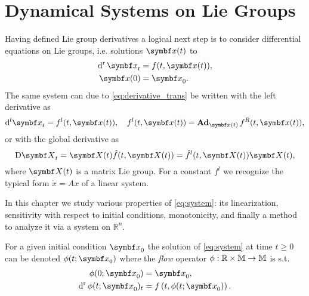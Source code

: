 
\chapter{Dynamical Systems on Lie Groups}

Having defined Lie group derivatives a logical next step is to consider differential equations on Lie groups, i.e. solutions $\x(t)$ to
\begin{equation}
  \label{eq:system}
  \begin{aligned}
    \dr \x_t & = f(t, \x(t)), \\
    \x(0)    & = \x_0.
  \end{aligned}
\end{equation}
The same system can due to \eqref{eq:derivative_trans} be written with the left derivative as
\begin{equation}
  \mathrm{d}^l \x_t = f^l(t, \x(t)), \quad f^l(t, \x(t)) = \bAd_{\x(t)} f^R(t, \x(t)),
\end{equation}
or with the global derivative as
\begin{equation}
  \mathrm{D} \X_t = \X(t) \hat f(t, \X(t)) = \hat f^l(t, \X(t)) \X(t),
\end{equation}
where $\X(t)$ is a matrix Lie group. For a constant $f^l$ we recognize the typical form $\dot x = Ax$ of a linear system.

In this chapter we study various properties of \eqref{eq:system}: its linearization, sensitivity with respect to initial conditions, monotonicity, and finally a method to analyze it via a system on $\mathbb{R}^n$.

For a given initial condition $\x_{0}$ the solution of \eqref{eq:system} at time $t \geq 0$ can be denoted $\phi(t; \x_{0})$ where the \emph{flow} operator $\phi : \mathbb{R} \times {\mathbb{M}} \rightarrow {\mathbb{M}}$ is s.t.
\begin{equation}
  \begin{aligned}
    \phi(0; \x_{0})         & = \x_{0},                            \\
    \dr \phi(t; \x_{0})_{t} & = f\left(t, \phi(t; \x_{0}) \right).
  \end{aligned}
\end{equation}

